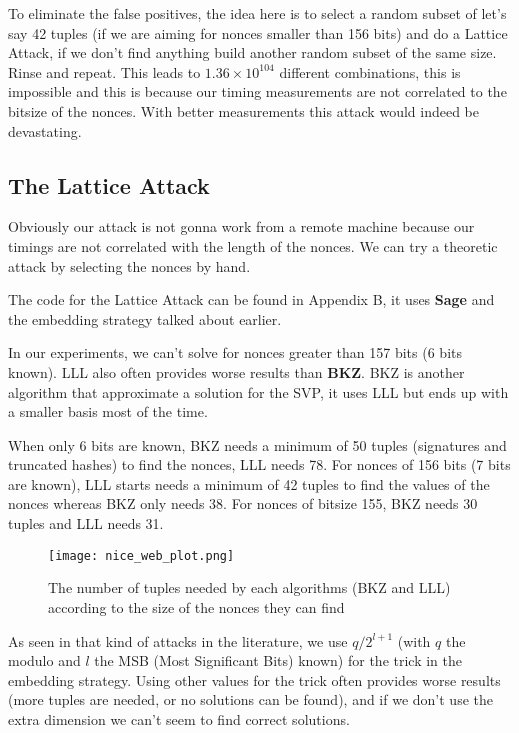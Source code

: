 \documentclass[a4paper,11pt]{article}
\begin{document}
To eliminate the false positives, the idea here is to select a random subset of let's say 42 tuples (if we are aiming for nonces smaller than 156 bits) and do a Lattice Attack, if we don't find anything build another random subset of the same size. Rinse and repeat. This leads to $1.36 \times 10^{104}$ different combinations, this is impossible and this is because our timing measurements are not correlated to the bitsize of the nonces. With better measurements this attack would indeed be devastating.

\subsection{The Lattice Attack}

Obviously our attack is not gonna work from a remote machine because our timings are not correlated with the length of the nonces. We can try a theoretic attack by selecting the nonces by hand.

The code for the Lattice Attack can be found in Appendix B, it uses \textbf{Sage} and the embedding strategy talked about earlier.

In our experiments, we can't solve for nonces greater than 157 bits (6 bits known). LLL also often provides worse results than \textbf{BKZ}. BKZ is another algorithm that approximate a solution for the SVP, it uses LLL but ends up with a smaller basis most of the time.

When only 6 bits are known, BKZ needs a minimum of 50 tuples (signatures and truncated hashes) to find the nonces, LLL needs 78. For nonces of 156 bits (7 bits are known), LLL starts needs a minimum of 42 tuples to find the values of the nonces whereas BKZ only needs 38. For nonces of bitsize 155, BKZ needs 30 tuples and LLL needs 31.

\begin{figure}[H]
\texttt{[image: nice\_web\_plot.png]}
\caption{The number of tuples needed by each algorithms (BKZ and LLL) according to the size of the nonces they can find}
\end{figure}

As seen in that kind of attacks in the literature, we use $q / 2^{l + 1}$ (with $q$ the modulo and $l$ the MSB (Most Significant Bits) known) for the trick in the embedding strategy. Using other values for the trick often provides worse results (more tuples are needed, or no solutions can be found), and if we don't use the extra dimension we can't seem to find correct solutions.
\end{document}
